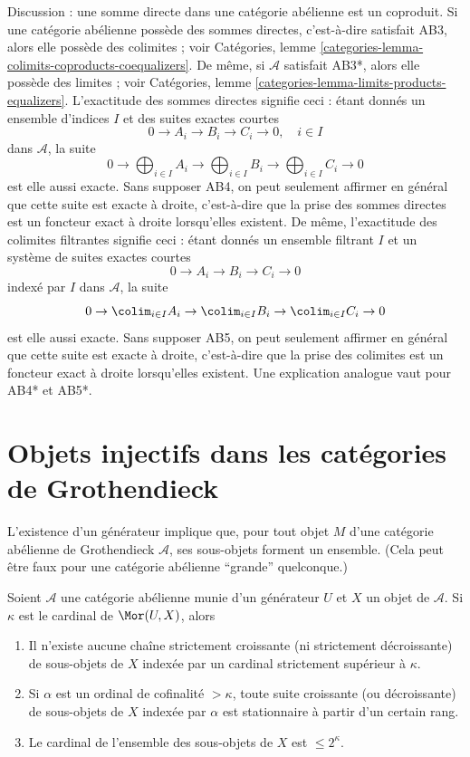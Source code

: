 \noindent
Discussion : une somme directe dans une catégorie abélienne est un coproduit.
Si une catégorie abélienne possède des sommes directes, c'est-à-dire satisfait
AB3, alors elle possède des colimites ; voir
Catégories, lemme \ref{categories-lemma-colimits-coproducts-coequalizers}. 
De même, si $\mathcal{A}$ satisfait AB3*, alors elle possède des limites ; voir
Catégories, lemme \ref{categories-lemma-limits-products-equalizers}. 
L'exactitude des sommes directes signifie ceci : étant donnés un ensemble
d'indices $I$ et des suites exactes courtes
$$
0 \to A_i \to B_i \to C_i \to 0,\quad i \in I
$$
dans $\mathcal{A}$, la suite
$$
0 \to
\bigoplus\nolimits_{i \in I} A_i \to
\bigoplus\nolimits_{i \in I} B_i \to
\bigoplus\nolimits_{i \in I} C_i \to 0
$$
est elle aussi exacte. Sans supposer AB4, on peut seulement affirmer en général
que cette suite est exacte à droite, c'est-à-dire que la prise des sommes
directes est un foncteur exact à droite lorsqu'elles existent. De même,
l'exactitude des colimites filtrantes signifie ceci : étant donnés un ensemble
filtrant $I$ et un système de suites exactes courtes
$$
0 \to A_i \to B_i \to C_i \to 0
$$
indexé par $I$ dans $\mathcal{A}$, la suite
$$
0 \to
\colim_{i \in I} A_i \to
\colim_{i \in I} B_i \to
\colim_{i \in I} C_i \to 0
$$
est elle aussi exacte. Sans supposer AB5, on peut seulement affirmer en général
que cette suite est exacte à droite, c'est-à-dire que la prise des colimites
est un foncteur exact à droite lorsqu'elles existent. Une explication analogue
vaut pour AB4* et AB5*.
\section{Objets injectifs dans les catégories de Grothendieck}
\label{section-grothendieck-categories}

\noindent
L'existence d'un générateur implique que, pour tout objet $M$ d'une
catégorie abélienne de Grothendieck $\mathcal{A}$, ses sous-objets
forment un ensemble. (Cela peut être faux pour une catégorie abélienne
``grande'' quelconque.)

\begin{lemma}
\label{lemma-set-of-subobjects}
Soient $\mathcal{A}$ une catégorie abélienne munie d'un générateur $U$ et
$X$ un objet de $\mathcal{A}$. Si $\kappa$ est le cardinal de
$\Mor(U, X)$, alors
\begin{enumerate}
\item Il n'existe aucune chaîne strictement croissante
(ni strictement décroissante) de sous-objets de $X$ indexée par
un cardinal strictement supérieur à $\kappa$.
\item Si $\alpha$ est un ordinal de cofinalité $> \kappa$,
toute suite croissante (ou décroissante) de sous-objets de $X$
indexée par $\alpha$ est stationnaire à partir d'un certain rang.
\item Le cardinal de l'ensemble des sous-objets de $X$
est $\leq 2^\kappa$.
\end{enumerate}
\end{lemma}

